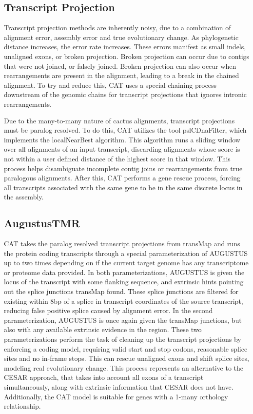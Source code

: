 \documentclass[fleqn,10pt]{wlscirep}
\begin{document}
\subsection{Transcript Projection}
Transcript projection methods are inherently noisy, due to a combination of alignment error, assembly error and true evolutionary change. As phylogenetic distance increases, the error rate increases. These errors manifest as small indels, unaligned exons, or broken projection. Broken projection can occur due to contigs that were not joined, or falsely joined. Broken projection can also occur when rearrangements are present in the alignment, leading to a break in the chained alignment. To try and reduce this, CAT uses a special chaining process downstream of the genomic chains for transcript projections that ignores intronic rearrangements.

Due to the many-to-many nature of cactus alignments, transcript projections must be paralog resolved. To do this, CAT utilizes the tool pslCDnaFilter, which implements the localNearBest algorithm. This algorithm runs a sliding window over all alignments of an input transcript, discarding alignments whose score is not within a user defined distance of the highest score in that window. This process helps disambiguate incomplete contig joins or rearrangements from true paralogous alignments. After this, CAT performs a gene rescue process, forcing all transcripts associated with the same gene to be in the same discrete locus in the assembly.

\subsection{AugustusTMR}

CAT takes the paralog resolved transcript projections from transMap and runs the protein coding transcripts through a special parameterization of AUGUSTUS up to two times depending on if the current target genome has any transcriptome or proteome data provided. In both parameterizations, AUGUSTUS is given the locus of the transcript with some flanking sequence, and extrinsic hints pointing out the splice junctions transMap found. These splice junctions are filtered for existing within 8bp of a splice in transcript coordinates of the source transcript, reducing false positive splice caused by alignment error. In the second parameterization, AUGUSTUS is once again given the transMap junctions, but also with any available extrinsic evidence in the region. These two parameterizations perform the task of cleaning up the transcript projections by enforcing a coding model, requiring valid start and stop codons, reasonable splice sites and no in-frame stops. This can rescue unaligned exons and shift splice sites, modeling real evolutionary change. This process represents an alternative to the CESAR approach, that takes into account all exons of a transcript simultaneously, along with extrinsic information that CESAR does not have. Additionally, the CAT model is suitable for genes with a 1-many orthology relationship.
\end{document}

